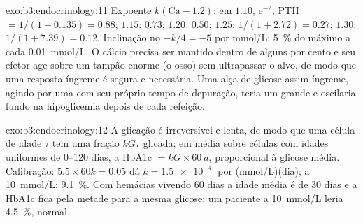 \begin{solution}{exo:b3:endocrinology:11}
Expoente $k(\text{Ca} - 1.2)$: em $1.10$, $\mathrm{e}^{-2}$, PTH $= 1/
(1 + 0.135) = 0.88$; $1.15$: $0.73$; $1.20$: $0.50$; $1.25$: $1/(1 +
2.72) = 0.27$; $1.30$: $1/(1 + 7.39) = 0.12$. Inclinação no  $-k/4 = -5$ por mmol/L: \qty{5}{\%} do máximo a cada
\qty{0.01}{mmol/L}. O cálcio precisa ser mantido dentro de alguns por
cento e seu efetor age sobre um tampão enorme (o osso) sem ultrapassar o
alvo, de modo que uma resposta íngreme é segura e necessária. Uma alça
de glicose assim íngreme, agindo por uma  com seu próprio tempo
de depuração, teria um  grande e oscilaria fundo na
hipoglicemia depois de cada refeição.
\end{solution}

\begin{solution}{exo:b3:endocrinology:12}
A glicação é irreversível e lenta, de modo que uma célula de idade
$\tau$ tem uma fração $kG\tau$ glicada; em média sobre células com idades
uniformes de \numrange{0}{120} dias, a HbA1c $= kG\times\qty{60}{d}$,
proporcional à glicose média. Calibração: $5.5\times 60k = 0.05$ dá $k =
\qty{1.5e-4}{}$ por (mmol/L)(dia); a \qty{10}{mmol/L}: \qty{9.1}{\%}. Com
hemácias vivendo 60 dias a idade média é de 30 dias e a HbA1c fica pela
metade para a mesma glicose: um paciente a \qty{10}{mmol/L} leria
\qty{4.5}{\%}, normal.
\end{solution}

